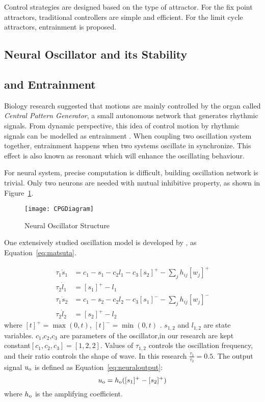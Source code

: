 Control strategies are designed based on the type of attractor.
For the fix point attractors, traditional \pd controllers are simple and efficient.
For the limit cycle attractors,  entrainment is proposed.


\subsection{Neural Oscillator and its Stability}


\subsection{\cpg and Entrainment}
Biology research suggested that motions are mainly controlled by the organ called \emph{Central Pattern Generator}, a small autonomous network that generates rhythmic signals.
From dynamic perspective, this idea of control motion by rhythmic signals can be modelled as entrainment \citep{Gonz'alez-Miranda2004}.
When coupling two oscillation system together, entrainment happens when two systems oscillate in synchronize. 
This effect is also known as resonant which will enhance the oscillating behaviour. 


For neural system, precise computation is difficult,  building oscillation network is trivial. 
Only two neurons are needed with mutual inhibitive property, as shown in Figure~\ref{fig:cpgdia}.
\begin{figure}[h]
\begin{center}
\texttt{[image: CPGDiagram]}
\caption{Neural Oscillator Structure}
\label{fig:cpgdia}
\end{center}
\end{figure}


One extensively studied oscillation model is developed by \citet{neurooscillation}, as Equation~\ref{eq:matsuta}.

\begin{align}
\tau_{1} \dot{s}_{1}&=c_1-s_{1}-c_2 l_{1}-c_3 [s_{2}]^{+}-\sum_{j}h_{ij}[w_{j}]^{+} \nonumber\\
\tau_{2} \dot{l}_{1}&=[s_{1}]^{+}-l_{1} \nonumber\\
\tau_{1} \dot{s}_{2}&=c_1-s_{2}-c_2 l_{2}-c_3 [s_{1}]^{-}-\sum_{j}h_{ij}[w_{j}]^{-} \nonumber\\
\tau_{2} \dot{l}_{2}&=[s_{2}]^{+}-l_{2}
\label{eq:matsuta}
\end{align}
where $[t]^{+}=\max(0,t)$, $[t]^{-}=\min(0,t)$ .
$s_{1,2}$ and $l_{1,2}$ are state variables.
$c_1$,$c_2$,$c_3$ are parameters of the oscillator,in our research are kept constant$[c_1,c_2,c_3]=[1,2,2]$.
Values of $\tau_{1,2}$ controls the oscillation frequency, and their ratio controls the shape of wave.
In this research $\frac{\tau_{1}}{\tau_{2}}=0.5$.
The output signal $u_{\mathrm{o}}$ is defined as Equation~\ref{eq:neuraloutput}:
\begin{equation}
u_{\mathrm{o}}=h_{\mathrm{o}}([s_{1}]^{+}-[s_{2}]^{+})
\label{eq:neuraloutput}
\end{equation}
where $h_{\mathrm{o}}$ is the amplifying coefficient.

